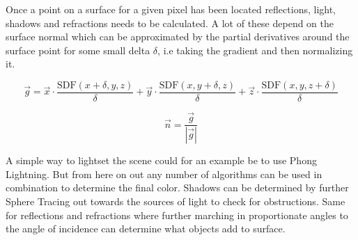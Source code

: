 				Once a point on a surface for a given pixel has been located
				reflections, light, shadows and refractions needs to be calculated. A
				lot of these depend on the surface normal which can be approximated by
				the partial derivatives around the surface point for some small delta
				$\delta$, i.e taking the gradient and then normalizing it.

				$$\vec{g} = \vec{x}\cdot\frac{\text{SDF}(x+\delta, y, z)}{\delta} +
				\vec{y}\cdot\frac{\text{SDF}(x, y+\delta, z)}{\delta} +
				\vec{z}\cdot\frac{\text{SDF}(x, y, z+\delta)}{\delta} $$

				$$\vec{n} = \frac{\vec{g}}{|\vec{g}|} $$

				A simple way to lightset the scene could for an example be to use Phong
				Lightning\cite{Phong}. But from here on out any number of algorithms
				can be used in combination to determine the final color. Shadows can be
				determined by further Sphere Tracing out towards the sources of light
				to check for obstructions. Same for reflections and refractions where
				further marching in proportionate angles to the angle of incidence can
				determine what objects add to surface.
